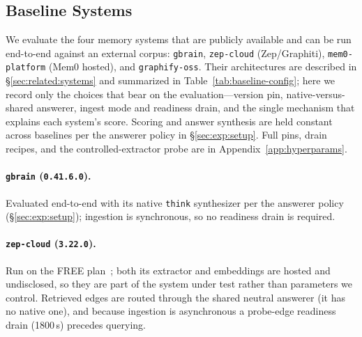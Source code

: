 \subsection{Baseline Systems}
\label{sec:baselines}

We evaluate the four memory systems that are publicly available and can be run
end-to-end against an external corpus: \texttt{gbrain}, \texttt{zep-cloud}
(Zep/Graphiti), \texttt{mem0-platform} (Mem0 hosted), and \texttt{graphify-oss}.
Their architectures are described in \S\ref{sec:related:systems} and summarized
in Table~\ref{tab:baseline-config}; here we record only the choices that bear on
the evaluation---version pin, native-versus-shared answerer, ingest mode and
readiness drain, and the single mechanism that explains each system's score.
Scoring and answer synthesis are held constant across baselines per the answerer
policy in \S\ref{sec:exp:setup}. Full pins, drain recipes, and the
controlled-extractor probe are in Appendix~\ref{app:hyperparams}.

\paragraph{\texttt{gbrain} (\texttt{0.41.6.0}).}
Evaluated end-to-end with its native \texttt{think} synthesizer per the answerer
policy (\S\ref{sec:exp:setup}); ingestion is synchronous, so no readiness drain
is required.

\paragraph{\texttt{zep-cloud} (\texttt{3.22.0}).}
Run on the FREE plan~\citep{zep_graphiti_2025}; both its extractor and embeddings
are hosted and undisclosed, so they are part of the system under test rather than
parameters we control. Retrieved edges are routed through the shared neutral
answerer (it has no native one), and because ingestion is asynchronous a
probe-edge readiness drain (1800\,s) precedes querying.

